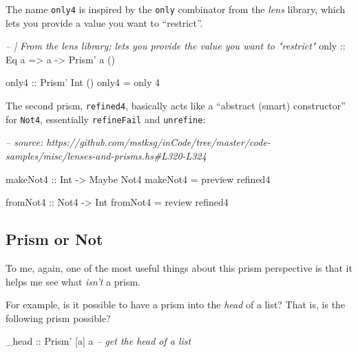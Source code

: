 \documentclass[]{article}
\newenvironment{Shaded}{}{}
\newcommand{\CommentTok}[1]{\textcolor[rgb]{0.38,0.63,0.69}{\textit{#1}}}
\newcommand{\DataTypeTok}[1]{\textcolor[rgb]{0.56,0.13,0.00}{#1}}
\newcommand{\DecValTok}[1]{\textcolor[rgb]{0.25,0.63,0.44}{#1}}
\newcommand{\FunctionTok}[1]{\textcolor[rgb]{0.02,0.16,0.49}{#1}}
\newcommand{\NormalTok}[1]{#1}
\newcommand{\OtherTok}[1]{\textcolor[rgb]{0.00,0.44,0.13}{#1}}
\begin{document}
The name \texttt{only4} is inspired by the \texttt{only} combinator from the
\emph{lens} library, which lets you provide a value you want to ``restrict''.

\begin{Shaded}
\begin{Highlighting}[]
\CommentTok{-- | From the lens library; lets you provide the value you want to "restrict"}
\OtherTok{only ::} \DataTypeTok{Eq}\NormalTok{ a }\OtherTok{=>}\NormalTok{ a }\OtherTok{->} \DataTypeTok{Prism'}\NormalTok{ a ()}

\OtherTok{only4 ::} \DataTypeTok{Prism'} \DataTypeTok{Int}\NormalTok{ ()}
\NormalTok{only4 }\FunctionTok{=}\NormalTok{ only }\DecValTok{4}
\end{Highlighting}
\end{Shaded}

The second prism, \texttt{refined4}, basically acts like a ``abstract (smart)
constructor'' for \texttt{Not4}, essentially \texttt{refineFail} and
\texttt{unrefine}:

\begin{Shaded}
\begin{Highlighting}[]
\CommentTok{-- source: https://github.com/mstksg/inCode/tree/master/code-samples/misc/lenses-and-prisms.hs#L320-L324}

\OtherTok{makeNot4 ::} \DataTypeTok{Int} \OtherTok{->} \DataTypeTok{Maybe} \DataTypeTok{Not4}
\NormalTok{makeNot4 }\FunctionTok{=}\NormalTok{ preview refined4}

\OtherTok{fromNot4 ::} \DataTypeTok{Not4} \OtherTok{->} \DataTypeTok{Int}
\NormalTok{fromNot4 }\FunctionTok{=}\NormalTok{ review refined4}
\end{Highlighting}
\end{Shaded}

\hypertarget{prism-or-not}{%
\subsection{Prism or Not}\label{prism-or-not}}

To me, again, one of the most useful things about this prism perspective is that
it helps me see what \emph{isn't} a prism.

For example, is it possible to have a prism into the \emph{head} of a list? That
is, is the following prism possible?

\begin{Shaded}
\begin{Highlighting}[]
\OtherTok{_head ::} \DataTypeTok{Prism'}\NormalTok{ [a] a           }\CommentTok{-- get the head of a list}
\end{Highlighting}
\end{Shaded}
\end{document}

